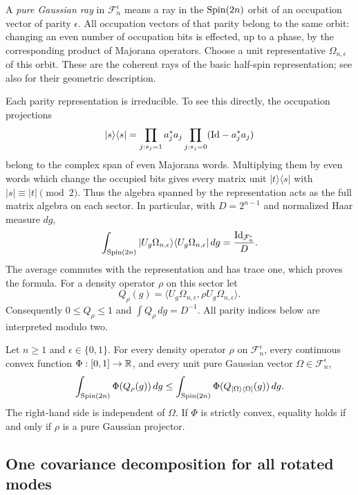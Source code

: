 A \emph{pure Gaussian ray} in $\mathcal F_n^\epsilon$ means a ray in the
$\operatorname{Spin}(2n)$ orbit of an occupation vector of parity $\epsilon$.
All occupation vectors of that parity belong to the same orbit: changing
an even number of occupation bits is effected, up to a phase, by the
corresponding product of Majorana operators.  Choose a unit representative
$\Omega_{n,\epsilon}$ of this orbit.  These are the coherent rays of the
basic half-spin representation; see also \cite{hackl2021} for their
geometric description.

Each parity representation is irreducible.  To see this directly, the
occupation projections
\[
 |s\rangle\langle s|
 =\prod_{j:s_j=1}a_j^*a_j\prod_{j:s_j=0}(\mathrm{Id}-a_j^*a_j)
\]
belong to the complex span of even Majorana words.  Multiplying them by
even words which change the occupied bits gives every matrix unit
$|t\rangle\langle s|$ with $|s|\equiv|t|\pmod2$.  Thus the algebra
spanned by the representation acts as the full matrix algebra on each
sector.  In particular, with $D=2^{n-1}$ and normalized Haar measure $dg$,
\begin{equation}
 \int_{\operatorname{Spin}(2n)}|U_g\Omega_{n,\epsilon}\rangle
       \langle U_g\Omega_{n,\epsilon}|\,dg
 =\frac{\mathrm{Id}_{\mathcal F_n^\epsilon}}D.
 \label{spin:resolution}
\end{equation}
The average commutes with the representation and has trace one, which
proves the formula.  For a density operator $\rho$ on this sector let
\[
 Q_\rho(g)=\langle U_g\Omega_{n,\epsilon},
                    \rho U_g\Omega_{n,\epsilon}\rangle.
\]
Consequently $0\le Q_\rho\le1$ and $\int Q_\rho\,dg=D^{-1}$.
All parity indices below are interpreted modulo two.

\begin{theorem}
\label{spin:convex-order}
Let $n\ge1$ and $\epsilon\in\{0,1\}$.  For every density operator
$\rho$ on $\mathcal F_n^\epsilon$, every continuous convex function
$\Phi:[0,1]\to\mathbb R$, and every unit pure Gaussian vector
$\Omega\in\mathcal F_n^\epsilon$,
\begin{equation}
 \int_{\operatorname{Spin}(2n)}\Phi(Q_\rho(g))\,dg
 \le
 \int_{\operatorname{Spin}(2n)}\Phi(Q_{|\Omega\rangle\langle\Omega|}(g))\,dg.
 \label{spin:order}
\end{equation}
The right-hand side is independent of $\Omega$.  If $\Phi$ is strictly
convex, equality holds if and only if $\rho$ is a pure Gaussian projector.
\end{theorem}

\subsection{One covariance decomposition for all rotated modes}

